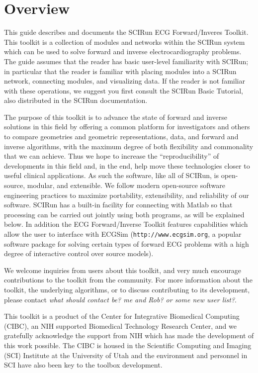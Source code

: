 \chapter{Overview}

\begin{introduction}

This guide describes and documents the SCIRun ECG Forward/Inveres
Toolkit. This toolkit is a collection of modules and networks
within the SCIRun system which can be used to solve forward and inverse
electrocardiography problems.  The guide assumes that the reader has basic
user-level familiarity with SCIRun; in particular that the reader is
familiar with placing modules into a SCIRun network, connecting modules,
and visualizing data. If the reader is not familiar with these operations,
we suggest you first consult the SCIRun Basic Tutorial, also distributed in
the SCIRun documentation.

The purpose of this toolkit is to advance the state of forward and inverse
solutions in this field by offering a common platform for investigators and
others to compare geometries and geometric representations, data, and
forward and inverse algorithms, with the maximum degree of both flexibility
and commonality that we can achieve. Thus we hope to increase the
``reproducibility'' of developments in this field and, in the end, help
move these technologies closer to useful clinical applications. As such the
software, like all of SCIRun, is open-source, modular, and extensible. We
follow modern open-source software engineering practices to maximize
portability, extensibility, and reliability of our software. SCIRun has a
built-in facility for connecting with Matlab so that processing can be
carried out jointly using both programs, as will be explained below. In
addition the ECG Forward/Inverse Toolkit features capabilities which allow
the user to interface with ECGSim (\texttt{http://www.ecgsim.org}, a
popular software package for solving certain types of forward ECG problems
with a high degree of interactive control over source models).  

We welcome inquiries from users about this toolkit, and very much encourage
contributions to the toolkit from the community.  For more information
about the toolkit, the underlying algorithms, or to discuss contributing to
its development, please contact \textit{what should contact be? me and Rob?
or some new user list?}.

This toolkit is a product of the Center for Integrative Biomedical
Computing (CIBC), an NIH supported Biomedical Technology Research Center,
and we gratefully acknowledge the support from NIH which has made the
development of this work possible. The CIBC is housed in the Scientific
Computing and Imaging (SCI) Institute at the University of Utah and the
environment and personnel in SCI have also been key to the toolbox
development. 

\end{introduction}

